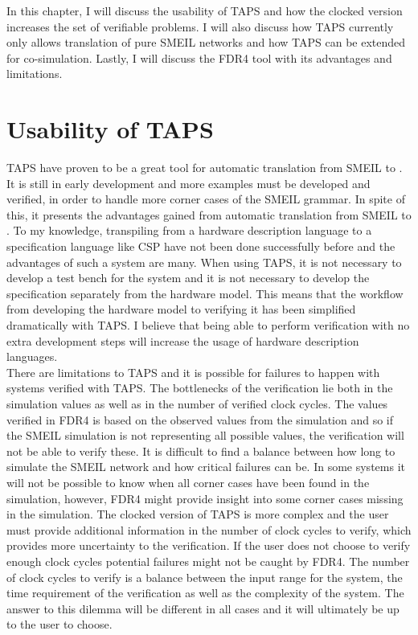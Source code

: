 In this chapter, I will discuss the usability of TAPS and how the clocked version increases the set of verifiable problems. I will also discuss how TAPS currently only allows translation of pure SMEIL networks and how TAPS can be extended for co-simulation. Lastly, I will discuss the FDR4 tool with its advantages and limitations.
\section{Usability of TAPS}
TAPS have proven to be a great tool for automatic translation from SMEIL to \cspm{}. It is still in early development and more examples must be developed and verified, in order to handle more corner cases of the SMEIL grammar. In spite of this, it presents the advantages gained from automatic translation from SMEIL to \cspm{}. To my knowledge, transpiling from a hardware description language to a specification language like CSP have not been done successfully before and the advantages of such a system are many. When using TAPS, it is not necessary to develop a test bench for the system and it is not necessary to develop the specification separately from the hardware model. This means that the workflow from developing the hardware model to verifying it has been simplified dramatically with TAPS. I believe that being able to perform verification with no extra development steps will increase the usage of hardware description languages. \\

There are limitations to TAPS and it is possible for failures to happen with systems verified with TAPS. The bottlenecks of the verification lie both in the simulation values as well as in the number of verified clock cycles. The values verified in FDR4 is based on the observed values from the simulation and so if the SMEIL simulation is not representing all possible values, the verification will not be able to verify these. It is difficult to find a balance between how long to simulate the SMEIL network and how critical failures can be. In some systems it will not be possible to know when all corner cases have been found in the simulation, however, FDR4 might provide insight into some corner cases missing in the simulation.
The clocked version of TAPS is more complex and the user must provide additional information in the number of clock cycles to verify, which provides more uncertainty to the verification. If the user does not choose to verify enough clock cycles potential failures might not be caught by FDR4. The number of clock cycles to verify is a balance between the input range for the system, the time requirement of the verification as well as the complexity of the system.
The answer to this dilemma will be different in all cases and it will ultimately be up to the user to choose. \\

